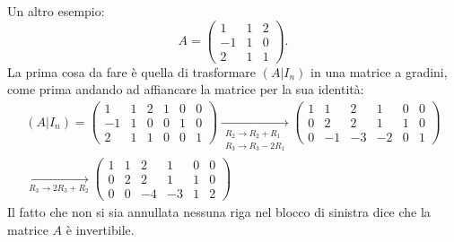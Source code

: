 Un altro esempio:
\begin{equation*}
  A=
  \begin{pmatrix}
    1 & 1 & 2\\
    -1 & 1 & 0\\
    2 & 1 & 1
  \end{pmatrix}.
\end{equation*}
La prima cosa da fare è quella di trasformare $(A|I_n)$ in una matrice a gradini, come
prima andando ad affiancare la matrice per la sua identità:
\begin{eqnarray*}
  (A|I_n)=\left(
  \begin{array}{ccc|ccc}
    1 & 1 & 2 & 1 & 0 & 0\\
    -1 & 1 & 0 & 0 & 1 & 0\\
    2 & 1 & 1 & 0 & 0 & 1
  \end{array}
  \right)\underset{
  \begin{matrix}
    R_2\to R_2 +R_1\\
    R_3\to R_3-2R_1
  \end{matrix}
  }{\to}\left(
  \begin{array}{ccc|ccc}
    1 & 1 & 2 & 1 & 0 & 0\\
    0 & 2 & 2 & 1 & 1 & 0\\
    0 & -1 & -3 & -2 & 0 & 1
  \end{array}
  \right)\\
  \underset{R_3\to 2R_3+R_2}{\to}
  \left(
  \begin{array}{ccc|ccc}
    1 & 1 & 2 & 1& 0&0\\
    0 & 2 & 2 & 1 & 1 & 0\\
    0 & 0 & -4 & -3 & 1 & 2
  \end{array}
  \right)
\end{eqnarray*}
Il fatto che non si sia annullata nessuna riga nel blocco di sinistra dice che la matrice $A$ è
invertibile.

